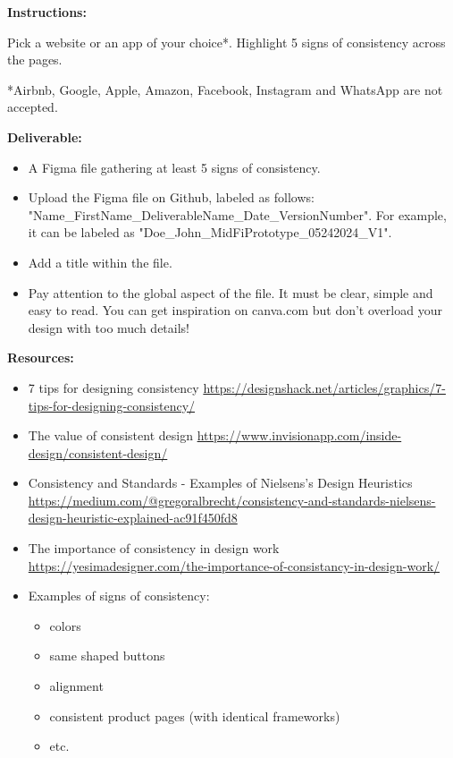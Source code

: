 \makeheaderfiles

\textbf{Instructions:}

Pick a website or an app of your choice*. Highlight 5 signs of consistency across the pages.

*Airbnb, Google, Apple, Amazon, Facebook, Instagram and WhatsApp are not accepted.

\textbf{Deliverable:}

\begin{itemize}
\item A Figma file gathering at least 5 signs of consistency.
\item Upload the Figma file on Github, labeled as follows: "Name\_FirstName\_DeliverableName\_Date\_VersionNumber". For example, it can be labeled as "Doe\_John\_MidFiPrototype\_05242024\_V1".
\item Add a title within the file.
\item Pay attention to the global aspect of the file. It must be clear, simple and easy to read. You can get inspiration on canva.com but don't overload your design with too much details!
\end{itemize}

\textbf{Resources:}

\begin{itemize}
\item 7 tips for designing consistency \url{https://designshack.net/articles/graphics/7-tips-for-designing-consistency/}
\item The value of consistent design \url{https://www.invisionapp.com/inside-design/consistent-design/}
\item Consistency and Standards - Examples of Nielsens's Design Heuristics \url{https://medium.com/@gregoralbrecht/consistency-and-standards-nielsens-design-heuristic-explained-ac91f450fd8}
\item The importance of consistency in design work \url{https://yesimadesigner.com/the-importance-of-consistancy-in-design-work/}
\item Examples of signs of consistency: 
\begin{itemize}
\item colors
\item same shaped buttons
\item alignment
\item consistent product pages (with identical frameworks)
\item etc.
\end{itemize}
\end{itemize}

